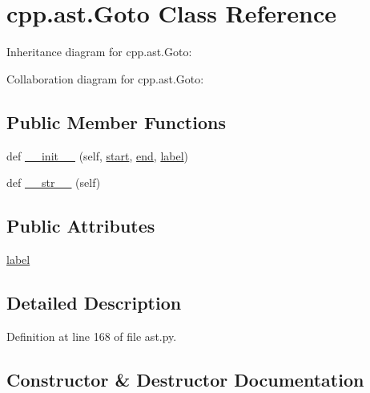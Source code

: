 \hypertarget{classcpp_1_1ast_1_1_goto}{}\section{cpp.\+ast.\+Goto Class Reference}
\label{classcpp_1_1ast_1_1_goto}


Inheritance diagram for cpp.\+ast.\+Goto\+:


Collaboration diagram for cpp.\+ast.\+Goto\+:
\subsection*{Public Member Functions}
\begin{DoxyCompactItemize}
\item 
def \hyperlink{classcpp_1_1ast_1_1_goto_a928e79374a90d01fc060985ea1e45260}{\+\_\+\+\_\+init\+\_\+\+\_\+} (self, \hyperlink{classcpp_1_1ast_1_1_node_a7b2aa97e6a049bb1a93aea48c48f1f44}{start}, \hyperlink{classcpp_1_1ast_1_1_node_a3c5e5246ccf619df28eca02e29d69647}{end}, \hyperlink{classcpp_1_1ast_1_1_goto_a685284ea5f3b21f39aff7f5db841c8f5}{label})
\item 
def \hyperlink{classcpp_1_1ast_1_1_goto_a508b6bc091cf06bfed73a33368c236c9}{\+\_\+\+\_\+str\+\_\+\+\_\+} (self)
\end{DoxyCompactItemize}
\subsection*{Public Attributes}
\begin{DoxyCompactItemize}
\item 
\hyperlink{classcpp_1_1ast_1_1_goto_a685284ea5f3b21f39aff7f5db841c8f5}{label}
\end{DoxyCompactItemize}


\subsection{Detailed Description}


Definition at line 168 of file ast.\+py.



\subsection{Constructor \& Destructor Documentation}
